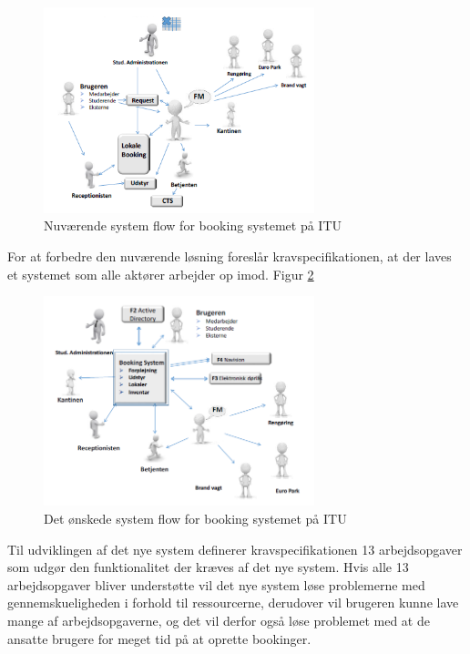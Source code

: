 \begin{figure}[h!]
  \centering
    \includegraphics[width=0.7\textwidth]{Appendix/GUI-Prototype/NuvaerendeFlow}
  \caption{Nuværende system flow for booking systemet på ITU}
\label{Baggrund_Kravspec_NuvaerendeFlow}
\end{figure}

For at forbedre den nuværende løsning foreslår kravspecifikationen, at der laves et systemet som alle aktører arbejder op imod.
Figur \ref{Baggrund_Kravspec_DesiredFlow} 

\begin{figure}[h!]
  \centering
    \includegraphics[width=0.7\textwidth]{Appendix/GUI-Prototype/DesiredFlow}
  \caption{Det ønskede system flow for booking systemet på ITU}
\label{Baggrund_Kravspec_DesiredFlow}
\end{figure}

Til udviklingen af det nye system definerer kravspecifikationen 13 arbejdsopgaver som udgør den funktionalitet der kræves af det nye system. Hvis alle 13 arbejdsopgaver bliver understøtte vil det nye system løse problemerne med gennemskueligheden i forhold til ressourcerne, derudover vil brugeren kunne lave mange af arbejdsopgaverne, og det vil derfor også løse problemet med at de ansatte brugere for meget tid på at oprette bookinger.

